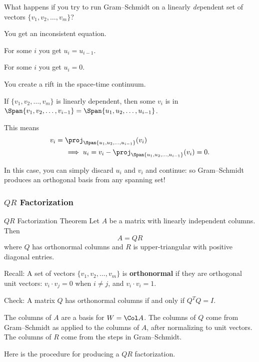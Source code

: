 \begin{pollframe}

\begin{bluebox}[Poll]{.8\linewidth}
  What happens if you try to run Gram--Schmidt on a linearly
  \emph{de\/}pendent set of vectors $\{v_1,v_2,\ldots,v_m\}$?
  \smallskip
  \begin{eAlpherate}
  \item You get an inconsistent equation.
  \item For some $i$ you get $u_i = u_{i-1}$.
  \item For some $i$ you get $u_i = 0$.
  \item You create a rift in the space-time continuum.
  \end{eAlpherate}
\end{bluebox}

\pause\bigskip
If $\{v_1,v_2,\ldots,v_m\}$ is linearly dependent, then some $v_i$ is in
$\Span\{v_1,v_2,\ldots,v_{i-1}\} = \Span\{u_1,u_2,\ldots,u_{i-1}\}$.  

\pause\medskip
This means\displayskips{1pt}
\[\begin{aligned} &v_i = \proj_{\Span\{u_1,u_2,\ldots,u_{i-1}\}}(v_i) \\
&\qquad\implies u_i = v_i - \proj_{\Span\{u_1,u_2,\ldots,u_{i-1}\}}(v_i) = 0. 
\end{aligned}\]

\pause\medskip
In this case, you can simply discard $u_i$ and $v_i$ and continue: so
Gram--Schmidt produces an orthogonal basis from any spanning set!

\end{pollframe}



\begin{frame}
\frametitle{$QR$ Factorization}

\vskip-3mm
\begin{oneoffthm}{$QR$ Factorization Theorem}
  Let $A$ be a matrix with linearly independent columns.  Then
  \[ A = QR \]
  where $Q$ has orthonormal columns and $R$ is upper-triangular with positive
  diagonal entries.
\end{oneoffthm}

\pause\smallskip
\alert{Recall:} A set of vectors $\{v_1,v_2,\ldots,v_m\}$ is
\textbf{orthonormal} if they are orthogonal unit vectors: $v_i\cdot v_j = 0$
when $i\neq j$, and $v_i\cdot v_i = 1$.

\pause\medskip
\alert{Check:} A matrix $Q$ has orthonormal columns if and only if $Q^TQ = I$.

\pause\bigskip
The columns of $A$ are a basis for $W = \Col A$.
\pause
The columns of $Q$ come from Gram--Schmidt as applied to the columns of $A$,
after normalizing to unit vectors.
\pause
The columns of $R$ come from the steps in Gram--Schmidt.

\pause\medskip
Here is the procedure for producing a $QR$ factorization.

\end{frame}



